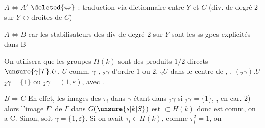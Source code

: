 $A\Leftrightarrow A'$ $\deleted{\Leftrightarrow}$ : traduction via dictionnaire entre $Y$ et $C$ (div. de degré
$2$ sur $Y\longleftrightarrow\text{droites de }C$)

$A\Longleftrightarrow B$ car les stabilisateurs des div de degré $2$ sur $Y$
sont les ss-gpes explicités dans B

On utilisera que les groupes $H(k)$ sont des produits
$1/2$-directs $\unsure{\gamma|\mathcal T}.U$, $U$ comm, $\gamma$ ,
$ {}_2\gamma$ d'ordre $1$ ou $2$,  $ {}_2U$ dans le centre de ,
. $({}_2\gamma).U$  $ {}_2\gamma=\{1\}$ ou $ {}_2\gamma=(1,\varepsilon)$, avec .

$B\Longrightarrow C$ \qquad En effet,  les images des $\tau_i$ dans
$\gamma$ étant dans $ {}_2\gamma$  si $ {}_2\gamma=\{1\}$, ,
en car. $2$) alors l'image $\Gamma'$ de $\Gamma$ dans $G(\unsure{s|k|S})$
est $\subset H(k)$ donc est comm, on a C.
Sinon, soit $\gamma=\{1,\varepsilon\}$. Si 
on avait $\tau_i\in H(k)$, comme $\tau_i^2=1$, on
